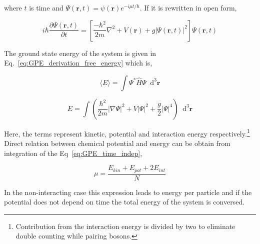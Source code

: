 \documentclass[a4paper,times,hidelinks,12pt]{article}
\newcommand*\dif{\mathop{}\!\mathrm{d}}
\begin{document}
\noindent  where $t$ is time and $\Psi(\boldsymbol{r}, t) = \psi(\boldsymbol{r})e^{-i\mu t/\hbar} $. If it is rewritten in open form,

\begin{equation}
\label{eq:GPE_time_indep}
i \hbar \frac{\partial\Psi(\boldsymbol{r}, t)}{\partial t} = \left[\frac{-\hbar^2}{2m}\nabla^2 + V(\boldsymbol{r}) + g|\Psi(\boldsymbol{r}, t)|^2 \right] \Psi(\boldsymbol{r}, t)
\end{equation}

\noindent The ground state energy of the system is given in Eq.~\eqref{eq:GPE_derivation_free_energy} which is,

\begin{equation}
\label{GPE_total_energy_general}
\langle E \rangle = \int \Psi^{*}\hat{H}\Psi \dif^3\boldsymbol{r}
\end{equation}

\begin{equation}
\label{GPE_total_energy}
E = \int \left(\frac {\hbar^2}{2m}|\nabla
\Psi|^2 + V|\Psi|^2 + \frac{g}{2}|\Psi|^4 \right) \dif^3 \boldsymbol{r}
\end{equation}

\noindent Here, the terms represent kinetic, potential and interaction energy respectively.\footnote{Contribution from the interaction energy is divided by two to eliminate double counting while pairing bosons.} Direct relation between chemical potential and energy can be obtain from integration of the Eq~\eqref{eq:GPE_time_indep}, 

\begin{equation}
\label{eq:mu_and_total_en}
\mu = \frac{E_{kin} + E_{pot} + 2E_{int}}{N}
\end{equation}

\noindent In the non-interacting case this expression leads to energy per particle and if the potential does not depend on time the total energy of the system is conversed. 

 
\end{document}

